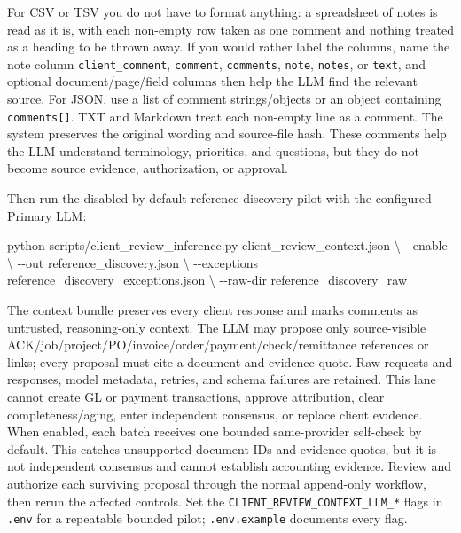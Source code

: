 \documentclass[
]{article}
\newenvironment{Shaded}{}{}
\newcommand{\AttributeTok}[1]{\textcolor[rgb]{0.49,0.56,0.16}{#1}}
\newcommand{\DataTypeTok}[1]{\textcolor[rgb]{0.56,0.13,0.00}{#1}}
\newcommand{\ExtensionTok}[1]{#1}
\newcommand{\NormalTok}[1]{#1}
\begin{document}
For CSV or TSV you do not have to format anything: a spreadsheet of
notes is read as it is, with each non-empty row taken as one comment and
nothing treated as a heading to be thrown away. If you would rather
label the columns, name the note column
\texttt{client\_\allowbreak{}comment}, \texttt{comment},
\texttt{comments}, \texttt{note}, \texttt{notes}, or \texttt{text}, and
optional document/page/field columns then help the LLM find the relevant
source. For JSON, use a list of comment strings/objects or an object
containing \texttt{comments{[}{]}}. TXT and Markdown treat each
non-empty line as a comment. The system preserves the original wording
and source-file hash. These comments help the LLM understand
terminology, priorities, and questions, but they do not become source
evidence, authorization, or approval.

Then run the disabled-by-default reference-discovery pilot with the
configured Primary LLM:

\begin{Shaded}
\begin{Highlighting}[]
\ExtensionTok{python}\NormalTok{ scripts/client\_review\_inference.py client\_review\_context.json }\DataTypeTok{\textbackslash{}}
  \AttributeTok{{-}{-}enable} \DataTypeTok{\textbackslash{}}
  \AttributeTok{{-}{-}out}\NormalTok{ reference\_discovery.json }\DataTypeTok{\textbackslash{}}
  \AttributeTok{{-}{-}exceptions}\NormalTok{ reference\_discovery\_exceptions.json }\DataTypeTok{\textbackslash{}}
  \AttributeTok{{-}{-}raw{-}dir}\NormalTok{ reference\_discovery\_raw}
\end{Highlighting}
\end{Shaded}

The context bundle preserves every client response and marks comments as
untrusted, reasoning-only context. The LLM may propose only
source-visible ACK/job/project/PO/invoice/order/payment/check/remittance
references or links; every proposal must cite a document and evidence
quote. Raw requests and responses, model metadata, retries, and schema
failures are retained. This lane cannot create GL or payment
transactions, approve attribution, clear completeness/aging, enter
independent consensus, or replace client evidence. When enabled, each
batch receives one bounded same-provider self-check by default. This
catches unsupported document IDs and evidence quotes, but it is not
independent consensus and cannot establish accounting evidence. Review
and authorize each surviving proposal through the normal append-only
workflow, then rerun the affected controls. Set the
\texttt{CLIENT\_\allowbreak{}REVIEW\_\allowbreak{}CONTEXT\_\allowbreak{}LLM\_\allowbreak{}*}
flags in \texttt{.env} for a repeatable bounded pilot;
\texttt{.env.example} documents every flag.
\end{document}

